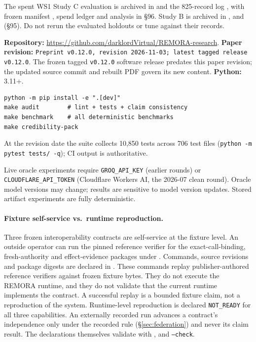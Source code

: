 \documentclass[10pt,twocolumn]{article}
\newcommand{\paperversion}{Preprint v0.12.0, revision 2026-11-03; latest tagged release \texttt{v0.12.0}}
\begin{document}
The spent WS1 Study C evaluation is archived in
 and the
825-record log ,
with frozen manifest ,
spend ledger 
and analysis in  \S96.
Study B is archived in ,
 and
 (\S95).
Do not rerun the evaluated holdouts or tune against their records.


\textbf{Repository:} \url{https://github.com/darklordVirtual/REMORA-research}.
\textbf{Paper revision:} \texttt{\paperversion}. The frozen tagged
\texttt{v0.12.0} software release predates this paper revision;
the updated source commit and rebuilt PDF govern its new content.
\textbf{Python:} 3.11+.

\begin{lstlisting}
python -m pip install -e ".[dev]"
make audit        # lint + tests + claim consistency
make benchmark    # all deterministic benchmarks
make credibility-pack
\end{lstlisting}

At the revision date the suite collects 10{,}850 tests across 706 test
files (\texttt{python -m pytest tests/ -q}); CI output is authoritative.

Live oracle experiments require \texttt{GROQ\_API\_KEY} (earlier rounds)
or \texttt{CLOUDFLARE\_API\_TOKEN} (Cloudflare Workers AI, the 2026-07
clean round). Oracle model versions may change; results are sensitive to
model version updates. Stored artifact experiments are fully deterministic.

\paragraph{Fixture self-service vs.\ runtime reproduction.}
Three frozen interoperability contracts are self-service at the fixture
level. An outside operator can run the pinned reference verifier for the
exact-call-binding, fresh-authority and effect-evidence packages under
. Commands, source revisions and package
digests are declared in .
These commands replay publisher-authored reference verifiers against
frozen fixture bytes. They do not execute the REMORA runtime, and they
do not validate that the current runtime implements the contract. A
successful replay is a bounded fixture claim, not a reproduction of the
system. Runtime-level reproduction is declared \texttt{NOT\_READY} for
all three capabilities. An externally recorded run advances a contract's
independence only under the recorded rule (\S\ref{sec:federation}) and
never its claim result. The declarations themselves validate with
,
 and
 \texttt{--check}.
\end{document}
